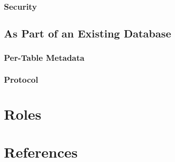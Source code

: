 \documentclass[11pt]{article}
\begin{document}
\subsubsection{Security}

\subsection{As Part of an Existing Database}

\subsubsection{Per-Table Metadata}

\subsubsection{Protocol}

\section{Roles}

\section{References}
\end{document}
